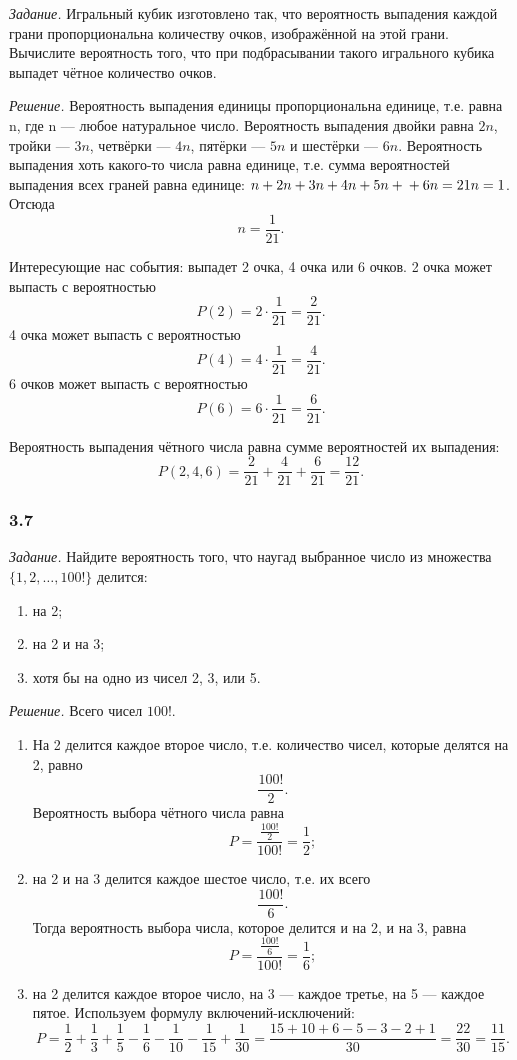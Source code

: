 \textit{Задание.}
Игральный кубик изготовлено так,
что вероятность выпадения каждой грани пропорциональна количеству очков, изображённой на этой грани.
Вычислите вероятность того, что при подбрасывании такого игрального кубика выпадет чётное количество очков.

\textit{Решение.} Вероятность выпадения единицы пропорциональна единице, т.е. равна n, где n --- любое натуральное число.
Вероятность выпадения двойки равна $2 n$, тройки --- $3 n$, четвёрки --- $4 n$, пятёрки --- $5 n$ и шестёрки --- $6 n$.
Вероятность выпадения хоть какого-то числа равна единице, т.е. сумма вероятностей выпадения всех граней равна единице: $n + 2 n + 3 n + 4 n + 5 n + \\ + 6 n = 21 n = 1$.
Отсюда
$$n =
\frac{1}{21}.$$

Интересующие нас события: выпадет 2 очка, 4 очка или 6 очков.
2 очка может выпасть с вероятностью
$$ P \left( 2 \right) =
2 \cdot \frac{1}{21} =
\frac{2}{21}.$$
4 очка может выпасть с вероятностью
$$ P \left( 4 \right) =
4 \cdot \frac{1}{21} =
\frac{4}{21}.$$
6 очков может выпасть с вероятностью
$$ P \left( 6 \right) =
6 \cdot \frac{1}{21} =
\frac{6}{21}.$$

Вероятность выпадения чётного числа равна сумме вероятностей их выпадения:
$$P \left( 2, 4, 6 \right) =
\frac{2}{21} + \frac{4}{21} + \frac{6}{21} =
\frac{12}{21}.$$

\subsubsection*{3.7}

\textit{Задание.} Найдите вероятность того, что наугад выбранное число из множества $\{ 1, 2, \dotsc, 100!\}$ делится:
\begin{enumerate}[label=\alph*)]
\item на 2;
\item на 2 и на 3;
\item хотя бы на одно из чисел 2, 3, или 5.
\end{enumerate}

\textit{Решение.} Всего чисел $100!$.
\begin{enumerate}[label=\alph*)]
\item На 2 делится каждое второе число, т.е. количество чисел, которые делятся на 2, равно
$$\frac{100!}{2}.$$
Вероятность выбора чётного числа равна
$$P =
\frac{ \frac{100!}{2} }{100!} =
\frac{1}{2};$$

\item на 2 и на 3 делится каждое шестое число, т.е. их всего
$$ \frac{100!}{6}.$$
Тогда вероятность выбора числа, которое делится и на 2, и на 3, равна
$$P =
\frac{ \frac{100!}{6} }{100!} =
\frac{1}{6};$$

\item на 2 делится каждое второе число, на 3 --- каждое третье, на 5 --- каждое пятое.
Используем формулу включений-исключений:
$$P =
\frac{1}{2} + \frac{1}{3} + \frac{1}{5} - \frac{1}{6} - \frac{1}{10} - \frac{1}{15} + \frac{1}{30} =
\frac{15+10+6-5-3-2+1}{30} =
\frac{22}{30} =
\frac{11}{15}.$$
\end{enumerate}

